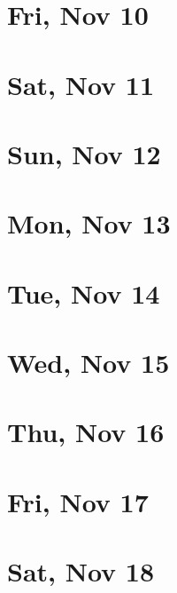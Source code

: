 	\section{Fri, Nov 10}
		
		
	\section{Sat, Nov 11}
		
		
	\section{Sun, Nov 12}
		
		
	\section{Mon, Nov 13}
		
		
	\section{Tue, Nov 14}
		
		
	\section{Wed, Nov 15}
		
		
	\section{Thu, Nov 16}
		
		
	\section{Fri, Nov 17}
		
		
	\section{Sat, Nov 18}
		
		
